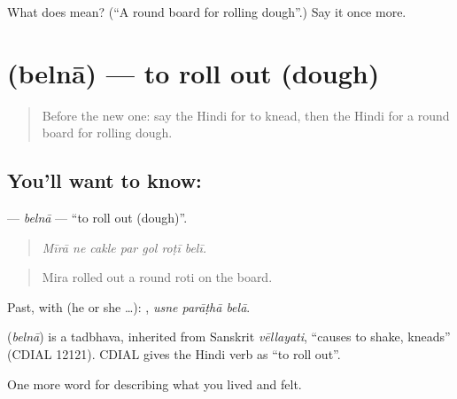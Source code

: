 \begin{tcolorbox}[breakable,colback=teal!4,colframe=teal!35!black,title={Before you move on}]
What does  mean? (\textquotedblleft{}A round board for rolling dough\textquotedblright{}.) Say it once more.
\end{tcolorbox}
\section[\texorpdfstring{\hi{बेलना} (belnā)}{बेलना (belnā)}]{ (belnā) — to roll out (dough)}

\label{lesson:HI-C520-belna}



\begin{quote}
Before the new one: say the Hindi for to knead, then the Hindi for a round board for rolling dough.
\end{quote}

\subsection*{You'll want to know: }
\textbf{} — \emph{belnā} — \textquotedblleft{}to roll out (dough)\textquotedblright{}.

\begin{quote}
      
\end{quote}

\begin{quote}
\emph{Mīrā ne cakle par gol roṭī belī.}
\end{quote}

\begin{quote}
Mira rolled out a round roti on the board.
\end{quote}

Past, with  (he or she …):   , \emph{usne parāṭhā belā}.

\begin{cousinweb}
\textbf{} (\emph{belnā}) is a tadbhava, inherited from Sanskrit \emph{vēllayati}, \textquotedblleft{}causes to shake, kneads\textquotedblright{} (CDIAL 12121). CDIAL gives the Hindi verb as \textquotedblleft{}to roll out\textquotedblright{}.
\end{cousinweb}

\begin{grammarlens}[title={What you've built}]
One more word for describing what you lived and felt.
\end{grammarlens}

